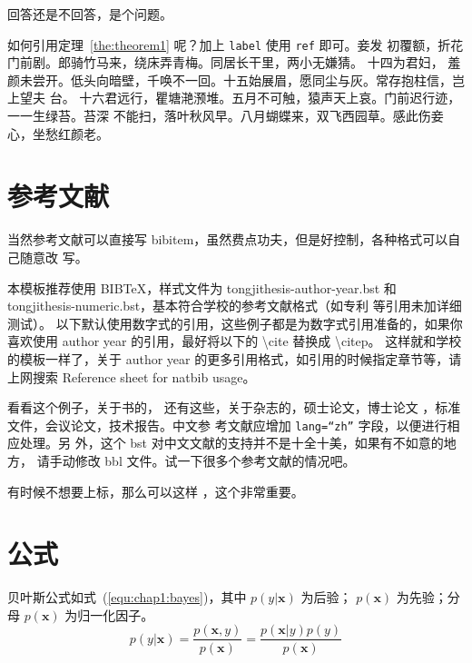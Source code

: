 \begin{problem}
 回答还是不回答，是个问题。
\end{problem}

如何引用定理~\ref{the:theorem1} 呢？加上 \verb|label| 使用 \verb|ref| 即可。妾发
初覆额，折花门前剧。郎骑竹马来，绕床弄青梅。同居长干里，两小无嫌猜。 十四为君妇，
羞颜未尝开。低头向暗壁，千唤不一回。十五始展眉，愿同尘与灰。常存抱柱信，岂上望夫
台。 十六君远行，瞿塘滟滪堆。五月不可触，猿声天上哀。门前迟行迹，一一生绿苔。苔深
不能扫，落叶秋风早。八月蝴蝶来，双飞西园草。感此伤妾心，坐愁红颜老。

\section{参考文献}
\label{sec:bib}
当然参考文献可以直接写 bibitem，虽然费点功夫，但是好控制，各种格式可以自己随意改
写。

本模板推荐使用 BIB\TeX，样式文件为
tongjithesis-author-year.bst 和 tongjithesis-numeric.bst，基本符合学校的参考文献格式（如专利
等引用未加详细测试）。
以下默认使用数字式的引用，这些例子都是为数字式引用准备的，如果你喜欢使用 author year 的引用，最好将以下的 \textbackslash cite 替换成 \textbackslash citep。
这样就和学校的模板一样了，关于 author year 的更多引用格式，如引用的时候指定章节等，请上网搜索 Reference sheet for natbib usage。

看看这个例子，关于书的\cite{tex, companion,
ColdSources}， 还有这些\cite{Krasnogor2004e, clzs,
zjsw}，关于杂志的\cite{ELIDRISSI94,
  MELLINGER96, SHELL02}，硕士论文\cite{zhubajie, metamori2004}，博士论文
\cite{shaheshang, FistSystem01}，标准文件\cite{IEEE-1363}，会议论文\cite{DPMG,kocher99}，技术报告\cite{NPB2}。中文参
考文献\cite{cnarticle}应增加 \texttt{lang=``zh''} 字段，以便进行相应处理。另
外，这个 bst 对中文文献\cite{cnproceed}的支持并不是十全十美，如果有不如意的地方，
请手动修改 bbl 文件。试一下很多个参考文献的情况吧\cite{BogdanSLOPEAdaptiveVariable2014,GossmannIdentificationsignificantgenetic2015,AlbrechtTopologicalapproachfuzzy1999,AlbrechtTopologicalConceptsHierarchies2001,AlbrechtTopologicaltheoryfuzziness1999,MoriasiModelevaluationguidelines2007,Jdatamodels2003}。

有时候不想要上标，那么可以这样 ，这个非常重要。



\section{公式}
\label{sec:equation}
贝叶斯公式如式~(\ref{equ:chap1:bayes})，其中 $p(y|\mathbf{x})$ 为后验；
$p(\mathbf{x})$ 为先验；分母 $p(\mathbf{x})$ 为归一化因子。
\begin{equation}
\label{equ:chap1:bayes}
p(y|\mathbf{x}) = \frac{p(\mathbf{x},y)}{p(\mathbf{x})}=
\frac{p(\mathbf{x}|y)p(y)}{p(\mathbf{x})}
\end{equation}

